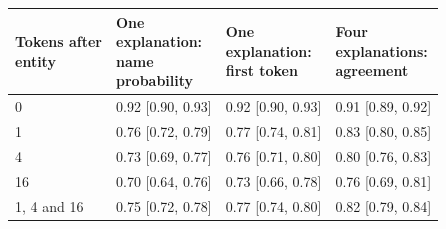 \begin{tabular}{@{}llll@{}}
\toprule
\shortstack[l]{Tokens after\\entity} & \shortstack[l]{One\\explanation:\\name\\probability} & \shortstack[l]{One\\explanation:\\first token} & \shortstack[l]{Four\\explanations:\\agreement} \\
\midrule
0 & 0.92 {\scriptsize[0.90, 0.93]} & 0.92 {\scriptsize[0.90, 0.93]} & 0.91 {\scriptsize[0.89, 0.92]} \\
1 & 0.76 {\scriptsize[0.72, 0.79]} & 0.77 {\scriptsize[0.74, 0.81]} & 0.83 {\scriptsize[0.80, 0.85]} \\
4 & 0.73 {\scriptsize[0.69, 0.77]} & 0.76 {\scriptsize[0.71, 0.80]} & 0.80 {\scriptsize[0.76, 0.83]} \\
16 & 0.70 {\scriptsize[0.64, 0.76]} & 0.73 {\scriptsize[0.66, 0.78]} & 0.76 {\scriptsize[0.69, 0.81]} \\
1, 4 and 16 & 0.75 {\scriptsize[0.72, 0.78]} & 0.77 {\scriptsize[0.74, 0.80]} & 0.82 {\scriptsize[0.79, 0.84]} \\
\bottomrule
\end{tabular}
